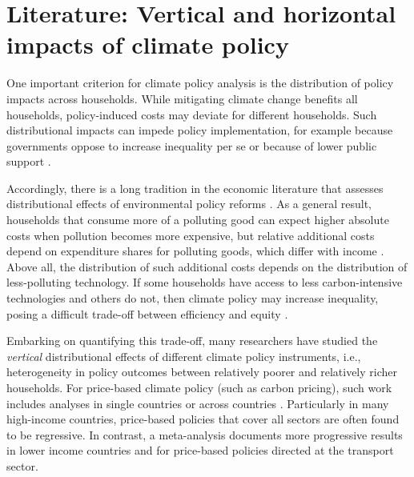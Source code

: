 \documentclass[12pt, a4paper]{article}
\begin{document}
\section{Literature: Vertical and horizontal impacts of climate policy} \label{sec:literature}

One important criterion for climate policy analysis is the distribution of policy impacts across households. While mitigating climate change benefits all households, policy-induced costs may deviate for different households. Such distributional impacts can impede policy implementation, for example because governments oppose to increase inequality per se or because of lower public support \autocite{Bergquist.2022,Douenne.2022}. 

Accordingly, there is a long tradition in the economic literature that assesses distributional effects of environmental policy reforms \autocite{Cremer.2003,Poterba.1991,Sandmo.1975,Stiglitz.2019}. As a general result, households that consume more of a polluting good can expect higher absolute costs when pollution becomes more expensive, but relative additional costs depend on expenditure shares for polluting goods, which differ with income \autocite{Jacobs.2019,Dorband.2019}. Above all, the distribution of such additional costs depends on the distribution of less-polluting technology. If some households have access to less carbon-intensive technologies and others do not, then climate policy may increase inequality, posing a difficult trade-off between efficiency and equity \autocite{Hansel.2022,TerryDinan.2016}. 

Embarking on quantifying this trade-off, many researchers have studied the \textit{vertical} distributional effects of different climate policy instruments, i.e., heterogeneity in policy outcomes between relatively poorer and relatively richer households. For price-based climate policy (such as carbon pricing), such work includes analyses in single countries \autocite{Goulder.2019,Grainger.2010,Rausch.2011,Garaffa.2021,Sterner.2012,Wu.2022} or across countries \autocite{Budolfson.2021,Feindt.2021,Dorband.2019,Steckel.2021b,VogtSchilb.2019,Missbach.2024}. Particularly in many high-income countries, price-based policies that cover all sectors are often found to be regressive. In contrast, a meta-analysis \autocite{Ohlendorf.2021} documents more progressive results in lower income countries and for price-based policies directed at the transport sector.
\end{document}
